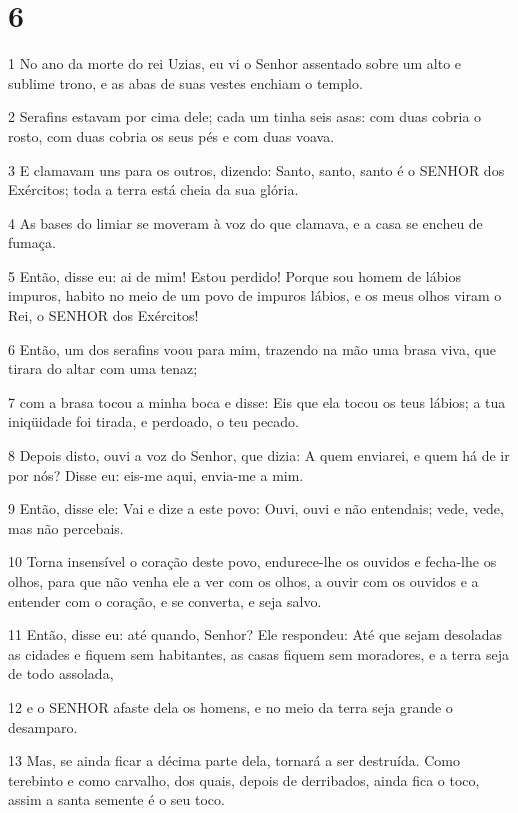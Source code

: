 \chapter{6}

\par 1 No ano da morte do rei Uzias, eu vi o Senhor assentado sobre um alto e sublime trono, e as abas de suas vestes enchiam o templo.
\par 2 Serafins estavam por cima dele; cada um tinha seis asas: com duas cobria o rosto, com duas cobria os seus pés e com duas voava.
\par 3 E clamavam uns para os outros, dizendo: Santo, santo, santo é o SENHOR dos Exércitos; toda a terra está cheia da sua glória.
\par 4 As bases do limiar se moveram à voz do que clamava, e a casa se encheu de fumaça.
\par 5 Então, disse eu: ai de mim! Estou perdido! Porque sou homem de lábios impuros, habito no meio de um povo de impuros lábios, e os meus olhos viram o Rei, o SENHOR dos Exércitos!
\par 6 Então, um dos serafins voou para mim, trazendo na mão uma brasa viva, que tirara do altar com uma tenaz;
\par 7 com a brasa tocou a minha boca e disse: Eis que ela tocou os teus lábios; a tua iniqüidade foi tirada, e perdoado, o teu pecado.
\par 8 Depois disto, ouvi a voz do Senhor, que dizia: A quem enviarei, e quem há de ir por nós? Disse eu: eis-me aqui, envia-me a mim.
\par 9 Então, disse ele: Vai e dize a este povo: Ouvi, ouvi e não entendais; vede, vede, mas não percebais.
\par 10 Torna insensível o coração deste povo, endurece-lhe os ouvidos e fecha-lhe os olhos, para que não venha ele a ver com os olhos, a ouvir com os ouvidos e a entender com o coração, e se converta, e seja salvo.
\par 11 Então, disse eu: até quando, Senhor? Ele respondeu: Até que sejam desoladas as cidades e fiquem sem habitantes, as casas fiquem sem moradores, e a terra seja de todo assolada,
\par 12 e o SENHOR afaste dela os homens, e no meio da terra seja grande o desamparo.
\par 13 Mas, se ainda ficar a décima parte dela, tornará a ser destruída. Como terebinto e como carvalho, dos quais, depois de derribados, ainda fica o toco, assim a santa semente é o seu toco.

